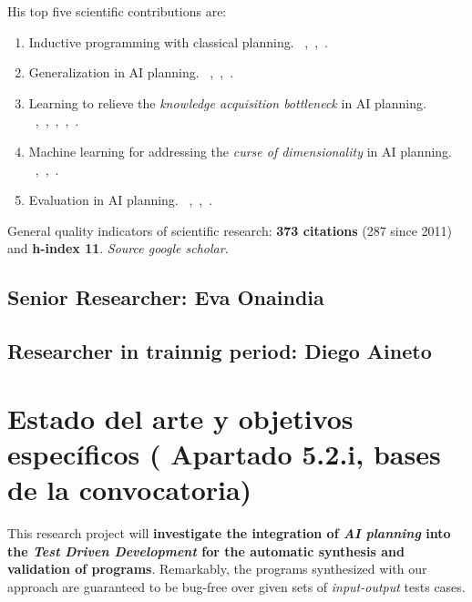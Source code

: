 \documentclass[10pt,a4paper]{paper}
\begin{document}
His top five scientific contributions are:
\begin{enumerate}
\item Inductive programming with classical planning. {\footnotesize~\cite{javi-ijcai17},~\cite{segovia2016generalized},~\cite{jimenez2015computing}}.
\item Generalization in AI planning. {\footnotesize~\cite{javi-icaps17},~\cite{damir-derived-ijcai16},~\cite{javi-fsc-ijcai16}}.
\item Learning to relieve the {\it knowledge acquisition bottleneck} in AI planning. {\footnotesize{~\cite{diego-icaps18},~\cite{jimenez2013integrating},~\cite{jimenez2008architecture},~\cite{jimenez2006planning},~\cite{lanchas2007learning}}}.
\item Machine learning for addressing the {\it curse of dimensionality} in AI planning. {\footnotesize~\cite{jimenez2012review},~\cite{de2011scaling},~\cite{de2008learning}}.  
\item Evaluation in AI planning. {\footnotesize~\cite{lopez2015deterministic},~\cite{lopez2013automating},~\cite{coles2012survey}}. 
\end{enumerate}

General quality indicators of scientific research: {\bf 373 citations} (287 since 2011) and {\bf h-index 11}. {\small\em Source google scholar}.


\subsection{Senior Researcher: Eva Onaindia} 

\subsection{Researcher in trainnig period: Diego Aineto}


\section{Estado del arte y objetivos específicos ( Apartado 5.2.i, bases de la convocatoria)}

This research project will {\bf investigate the integration of {\em AI planning} into the {\em Test Driven Development} for the automatic synthesis and validation of programs}. Remarkably, the programs synthesized with our approach are guaranteed to be bug-free over given sets of {\em input-output} tests cases.
\end{document}
